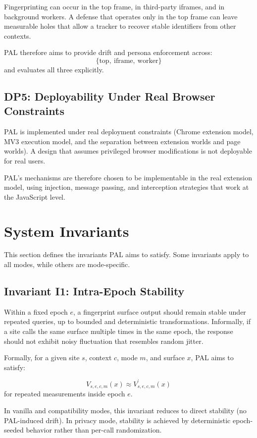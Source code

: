 \documentclass[11pt]{report}
\begin{document}
Fingerprinting can occur in the top frame, in third-party iframes, and in background workers. A defense that operates only in the top frame can leave measurable holes that allow a tracker to recover stable identifiers from other contexts.

PAL therefore aims to provide drift and persona enforcement across:
\[
\{\text{top},\ \text{iframe},\ \text{worker}\}
\]
and evaluates all three explicitly.

\subsection{DP5: Deployability Under Real Browser Constraints}

PAL is implemented under real deployment constraints (Chrome extension model, MV3 execution model, and the separation between extension worlds and page worlds). A design that assumes privileged browser modifications is not deployable for real users.

PAL’s mechanisms are therefore chosen to be implementable in the real extension model, using injection, message passing, and interception strategies that work at the JavaScript level.

\section{System Invariants}

This section defines the invariants PAL aims to satisfy. Some invariants apply to all modes, while others are mode-specific.

\subsection{Invariant I1: Intra-Epoch Stability}

Within a fixed epoch $e$, a fingerprint surface output should remain stable under repeated queries, up to bounded and deterministic transformations. Informally, if a site calls the same surface multiple times in the same epoch, the response should not exhibit noisy fluctuation that resembles random jitter.

Formally, for a given site $s$, context $c$, mode $m$, and surface $x$, PAL aims to satisfy:

\[
V_{s,e,c,m}(x) \approx V_{s,e,c,m}^{\prime}(x)
\]
for repeated measurements inside epoch $e$.

In vanilla and compatibility modes, this invariant reduces to direct stability (no PAL-induced drift). In privacy mode, stability is achieved by deterministic epoch-seeded behavior rather than per-call randomization.
\end{document}
